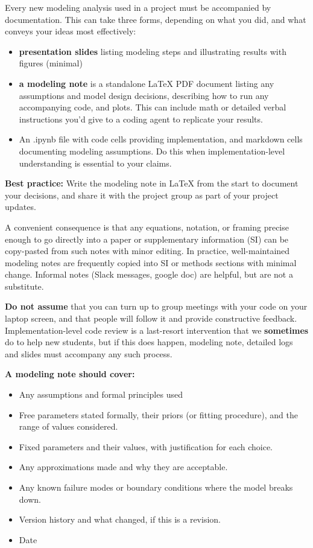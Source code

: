 \documentclass[11pt, letterpaper]{article}
\begin{document}
Every new modeling analysis used in a project must be accompanied by documentation. This can take three forms, depending on what you did, and what conveys your ideas most effectively:

\begin{itemize}
    \item \textbf{presentation slides} listing modeling steps and illustrating results with figures (minimal)
    \item \textbf{a modeling note} is a standalone \LaTeX{} PDF document listing any assumptions and model design decisions,  describing how to run any accompanying code, and  plots. This can include math or detailed verbal instructions you'd give to a coding agent to replicate your results.
    \item An .ipynb file with code cells providing implementation, and markdown cells documenting modeling assumptions. Do this when implementation-level understanding is essential to your claims.
\end{itemize}
 
\textbf{Best practice:} Write the modeling note in \LaTeX{} from the start to document your decisions, and share it with the project group as part of your project updates. 

A convenient consequence is that any equations, notation, or framing precise enough to go directly into a paper or supplementary information (SI) can be copy-pasted from such notes with minor editing. In practice, well-maintained modeling notes are frequently copied into SI or methods sections with minimal change. Informal notes (Slack messages, google doc) are helpful, but are not a substitute. 

\textbf{Do not assume} that you can turn up to group meetings with your code on your laptop screen, and that people will follow it and provide constructive feedback. Implementation-level code review is a last-resort intervention that we \textbf{sometimes} do to help new students, but if this does happen, modeling note, detailed logs and slides must accompany any such process.
 
\textbf{A modeling note should cover:}
 
\begin{itemize}[itemsep=0.2em]
  \item Any assumptions and formal principles used
  \item Free parameters stated formally, their priors (or fitting procedure), and the range of values considered.
  \item Fixed parameters and their values, with justification for each choice.
  \item Any approximations made and why they are acceptable.
  \item Any known failure modes or boundary conditions where the model breaks
    down.
  \item Version history and what changed, if this is a revision.
  \item Date
\end{itemize}
 
\end{document}
